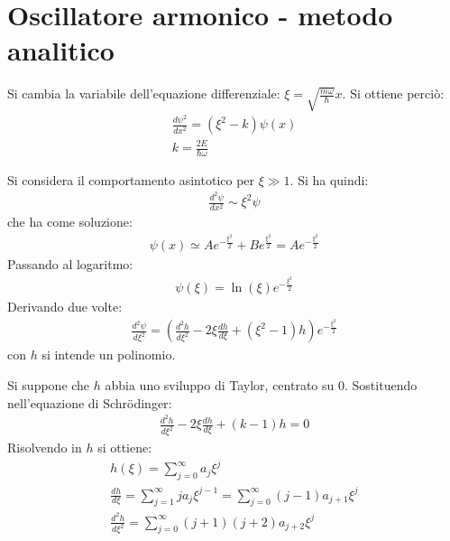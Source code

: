 \section{Oscillatore armonico - metodo analitico} %
Si cambia la variabile dell'equazione differenziale: $\xi =\sqrt{\frac{m\omega }{\hbar }}x$.
Si ottiene perciò:
\begin{equation}\begin{split}
\frac{d\psi ^2}{dx^2}=\left(\xi ^2 -k\right)\psi (x)\\
k=\frac{2E}{\hbar \omega }
\end{split}\end{equation}

Si considera il comportamento asintotico per $\xi \gg 1$. Si ha quindi:
\begin{equation}\begin{split}
\frac{d^2\psi }{dx^2}\sim \xi^2\psi 
\end{split}\end{equation}
che ha come soluzione:
\begin{equation}\begin{split}
\psi \left(x\right)\simeq Ae^{-\frac{\xi^2}{2}}+Be^{\frac{\xi^2}{2}}=Ae^{-\frac{\xi^2}{2}}
\end{split}\end{equation}
Passando al logaritmo:
\begin{equation}\begin{split}
\psi \left(\xi\right)=\ln\left(\xi\right)e^{-\frac{\xi^2}{2}}
\end{split}\end{equation}
Derivando due volte:
\begin{equation}\begin{split}
\frac{d^2\psi }{d\xi^2}=\left(\frac{d^2h}{d\xi^2}-2\xi \frac{dh}{d\xi}+\left(\xi^2 -1\right)h\right)e^{-\frac{\xi^2}{2}}
\end{split}\end{equation}
con $h$ si intende un polinomio.

Si suppone che $h$ abbia uno sviluppo di Taylor, centrato su $0$. Sostituendo nell'equazione di Schrödinger:
\begin{equation}\begin{split}
\frac{d^2h}{d\xi^2}-2\xi\frac{dh}{d\xi}+\left(k-1\right)h=0
\end{split}\end{equation}
Risolvendo in $h$ si ottiene:
\begin{equation}\begin{split}
h\left(\xi\right)=\sum_{j=0}^{\infty }a_j\xi^j \\
\frac{dh}{d\xi}=\sum_{j=1}^{\infty }ja_j\xi^{j-1}=\sum_{j=0}^{\infty }\left(j-1\right)a_{j+1}\xi^j \\
\frac{d^2h}{d\xi^2}=\sum_{j=0}^{\infty }\left(j+1\right)\left(j+2\right)a_{j+2}\xi^j
\end{split}\end{equation}

